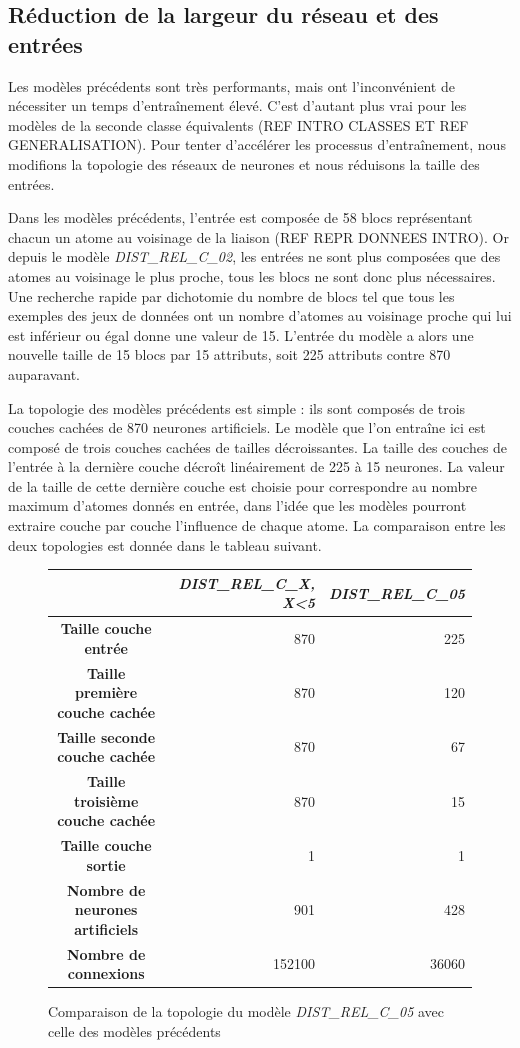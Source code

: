 \subsection{Réduction de la largeur du réseau et des entrées}
\par Les modèles précédents sont très performants, mais ont l'inconvénient de nécessiter un temps d'entraînement élevé. C'est d'autant plus vrai pour les modèles de la seconde classe équivalents (REF INTRO CLASSES ET REF GENERALISATION). Pour tenter d'accélérer les processus d'entraînement, nous modifions la topologie des réseaux de neurones et nous réduisons la taille des entrées.
\par Dans les modèles précédents, l'entrée est composée de 58 blocs représentant chacun un atome au voisinage de la liaison (REF REPR DONNEES INTRO). Or depuis le modèle \emph{DIST\_REL\_C\_02}, les entrées ne sont plus composées que des atomes au voisinage le plus proche, tous les blocs ne sont donc plus nécessaires. Une recherche rapide par dichotomie du nombre de blocs tel que tous les exemples des jeux de données ont un nombre d'atomes au voisinage proche qui lui est inférieur ou égal donne une valeur de 15. L'entrée du modèle a alors une nouvelle taille de 15 blocs par 15 attributs, soit 225 attributs contre 870 auparavant.
\par La topologie des modèles précédents est simple : ils sont composés de trois couches cachées de 870 neurones artificiels. Le modèle que l'on entraîne ici est composé de trois couches cachées de tailles décroissantes. La taille des couches de l'entrée à la dernière couche décroît linéairement de 225 à 15 neurones. La valeur de la taille de cette dernière couche est choisie pour correspondre au nombre maximum d'atomes donnés en entrée, dans l'idée que les modèles pourront extraire couche par couche l'influence de chaque atome. La comparaison entre les deux topologies est donnée dans le tableau suivant.

\begin{figure}[!h]
	\centering
	\begin{tabular}{|c|r|r|}
		\hline
		& \textbf{\emph{DIST\_REL\_C\_X, X<5}} & \textbf{\emph{DIST\_REL\_C\_05}}\\ \hline
		\textbf{Taille couche entrée} & 870 & 225 \\ \hline
		\textbf{Taille première couche cachée} & 870 & 120\\ \hline
		\textbf{Taille seconde couche cachée} & 870 & 67\\ \hline
		\textbf{Taille troisième couche cachée} & 870 & 15\\ \hline
		\textbf{Taille couche sortie} & 1 & 1\\ \hline
		\textbf{Nombre de neurones artificiels} & 901 & 428\\ \hline
		\textbf{Nombre de connexions} & 152100 & 36060 \\ \hline
	\end{tabular}
	
	\caption{Comparaison de la topologie du modèle \emph{DIST\_REL\_C\_05} avec celle des modèles précédents}
\end{figure}


